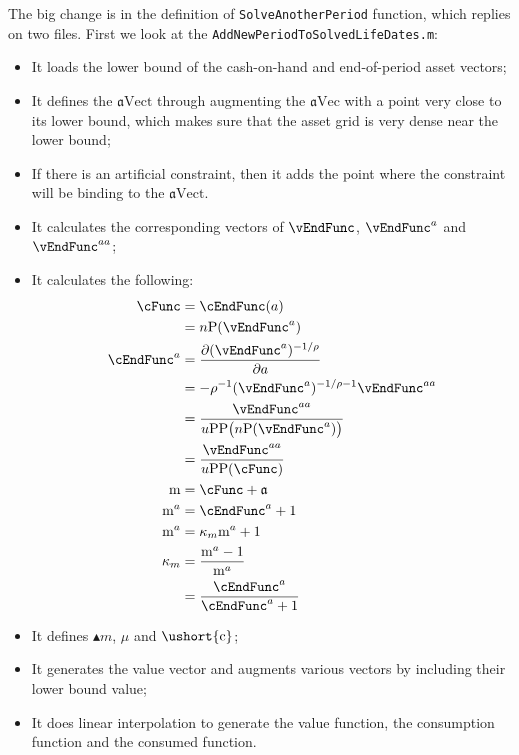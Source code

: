 \documentclass[titlepage,abstract]{\econtex}
\providecommand{\mFunc}{\ensuremath{\mathrm{m}}}
\providecommand{\aEndFunc}{\ensuremath{\mathfrak{a}}}
\begin{document}
The big change is in the definition of \texttt{SolveAnotherPeriod} function, which replies on two files. First we look at the \texttt{AddNewPeriodToSolvedLifeDates.m}:
      \begin{itemize}
        \item It loads the lower bound of the cash-on-hand and end-of-period asset vectors;
        \item It defines the $\ensuremath{\mathfrak{a}}\text{Vect}$ through augmenting the $\ensuremath{\mathfrak{a}}\text{Vec}$ with a point very close to its lower bound, which makes sure that the asset grid is very dense near the lower bound;
        \item If there is an artificial constraint, then it adds the point where the constraint will be binding to the $\ensuremath{\mathfrak{a}}\text{Vect}$.
        \item It calculates the corresponding vectors of $\vEndFunc$, $\vEndFunc^{a}$ and $\vEndFunc^{aa}$;
        \item It calculates the following:
        \begin{equation}\begin{gathered}\begin{aligned}
        \cFunc  & =  \cEndFunc(a) \\
         & =  n\text{P}(\vEndFunc^{a}) \\
        \cEndFunc^{a}  & = \frac{\partial (\vEndFunc^{a})^{-1/\rho}}{\partial a} \\
         & =  -\rho^{-1} (\vEndFunc^{a})^{-1/\rho-1} \vEndFunc^{aa} \\
         & =  \frac{\vEndFunc^{aa} }{u\text{PP}\big(
        n\text{P}(\vEndFunc^{a})\big)} \\
         & =  \frac{\vEndFunc^{aa} }{u\text{PP}(\cFunc)} \\
        \mFunc  & =  \cFunc + \aEndFunc \\
        \mFunc^{a}  & =  \cEndFunc^{a} + 1 \\
        \mFunc^{a}  & =  \kappa_{m}\mFunc^{a} + 1 \\
        \kappa_{m}  & =  \frac{\mFunc^{a}-1}{\mFunc^{a}} \\
         & =  \frac{\cEndFunc^{a}}{\cEndFunc^{a}+1}
        \end{aligned}\end{gathered}\end{equation}
        \item It defines $\ensuremath{\blacktriangle {m}}$, $\mu$ and $\ensuremath{\ushort{\mathrm{c}}}$;
        \item It generates the value vector and augments various vectors by including their lower bound value;
        \item It does linear interpolation to generate the value function, the consumption function and the consumed function.
        \end{itemize}
\end{document}

